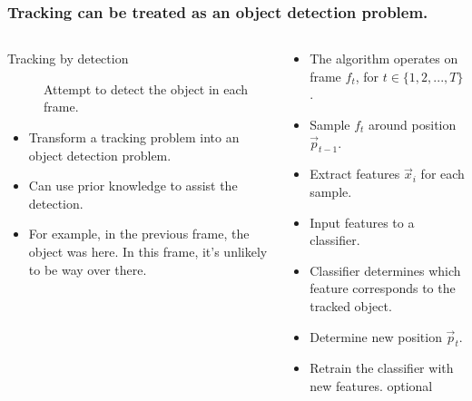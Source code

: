 \begin{frame}
    \frametitle{Tracking can be treated as an object detection problem. \cite{6671560}}
    \begin{columns}[T]
        \begin{column}{0.5\textwidth}
            \begin{description}
                \item [Tracking by detection] Attempt to detect the object in each frame.
            \end{description}
            \begin{itemize}
                \item Transform a tracking problem into an object detection problem.
                \item Can use prior knowledge to assist the detection.
                \item For example, in the previous frame, the object was here. In this frame, it's
                    unlikely to be way over there.
            \end{itemize}
        \end{column}
        \begin{column}{0.5\textwidth}
            \begin{itemize}
                \item The algorithm operates on frame \(f_t\), for \(t \in \{1, 2, ..., T\}\).
                \item Sample \(f_t\) around position \(\vec{p}_{t-1}\).
                \item Extract features \(\vec{x}_i\) for each sample.
                \item Input features to a classifier.
                \item Classifier determines which feature corresponds to the tracked object.
                \item Determine new position \(\vec{p}_t\).
                \item Retrain the classifier with new features. \alert{optional}
            \end{itemize}
        \end{column}
    \end{columns}
\end{frame}
